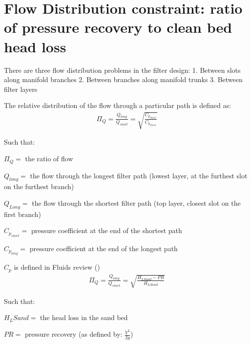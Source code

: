 \documentclass[letterpaper,10pt,english]{sphinxmanual}
\begin{document}
\section{Flow Distribution constraint: ratio of pressure recovery to clean bed head loss}
\label{\detokenize{Filtration/Filtration_Derivations:flow-distribution-constraint-ratio-of-pressure-recovery-to-clean-bed-head-loss}}
There are three flow distribution problems in the filter design:
1. Between slots along manifold branches
2. Between branches along manifold trunks
3. Between filter layers

The relative distribution of the flow through a particular path is defined as:
\begin{equation}\label{equation:Filtration/Filtration_Derivations:Filtration/Filtration_Derivations:6}
\begin{split}\Pi_Q = \frac{Q_{long}}{Q_{short}} = \sqrt{\frac{C_{p_{Short}}}{C_{p_{Short}}}}\end{split}
\end{equation}
\begin{DUlineblock}{0em}
\item[] Such that:
\item[] \(\Pi_Q =\) the ratio of flow
\item[] \(Q_{long} =\) the flow through the longest filter path (lowest layer, at the furthest slot on the furthest branch)
\item[] \(Q_{Long} =\) the flow through the shortest filter path (top layer, closest slot on the first branch)
\item[] \(C_{p_{short}} =\) pressure coefficient at the end of the shortest path
\item[] \(C_{p_{long}} =\) pressure coefficient at the end of the longest path
\end{DUlineblock}

\(C_p\) is defined in Fluids review ()
\begin{equation}\label{equation:Filtration/Filtration_Derivations:Filtration/Filtration_Derivations:7}
\begin{split}\Pi_Q = \frac{Q_{long}}{Q_{short}} = \sqrt{\frac{H_{LSand}-PR}{H_{LSand}}}\end{split}
\end{equation}
\begin{DUlineblock}{0em}
\item[] Such that:
\item[] \(H_LSand =\) the head loss in the sand bed
\item[] \(PR =\) pressure recovery (as defined by: \(\frac{V^2}{2g}\))
\end{DUlineblock}
\end{document}
